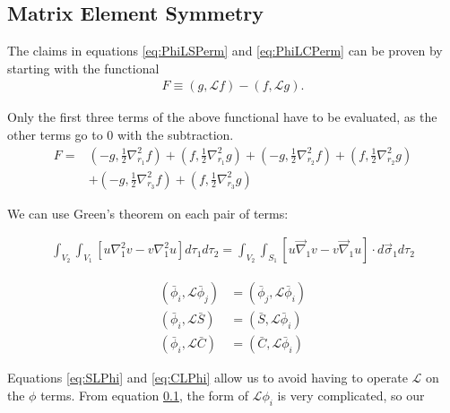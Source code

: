 \documentclass[Dissertation.tex]{subfiles}
\begin{document}
\subsection{Matrix Element Symmetry}
The claims in equations \ref{eq:PhiLSPerm} and \ref{eq:PhiLCPerm} can be proven by starting with the functional
\begin{align}
	F \equiv \left(g,\mathcal{L}f \right)-\left(f,\mathcal{L}g \right).
\end{align}

Only the first three terms of the above functional have to be evaluated, as the other terms go to 0 with the subtraction.
\begin{align}
	F=&\left({-g,\frac{1}{2} \nabla_{r_1}^2 f}\right)+\left({f,\frac{1}{2} \nabla_{r_1}^2 g}\right)+
	\left({-g,\frac{1}{2} \nabla_{r_2}^2 f}\right)+\left({f,\frac{1}{2} \nabla_{r_2}^2 g}\right) \nonumber \\
	&+\left({-g,\frac{1}{2} \nabla_{r_3}^2 f}\right)+\left({f,\frac{1}{2} \nabla_{r_3}^2 g}\right)
\end{align}

We can use Green's theorem on each pair of terms:


\begin{align}
	{\int _{V_2}{{\int_{V_1}{\left[{u{\nabla }_1^2 v-v{\nabla }_1^2 u}\right]{d \tau_1}}}{d \tau_2}}}
	= \int_{V_2} \int_{S_1} \left[u \vec{\nabla}_1 v - v \vec{\nabla}_1 u \right] \cdot d\vec{\sigma}_1 d\tau_2
\end{align}

\begin{subequations}
\label{eq:elem_symm}
\begin{align}
\left(\bar{\phi}_i, \mathcal{L} \bar{\phi}_j \right) &= \left(\bar{\phi}_j, \mathcal{L} \bar{\phi}_i \right) \\
\left(\bar{\phi}_i, \mathcal{L} \bar{S} \right) &= \left(\bar{S}, \mathcal{L} \bar{\phi}_i \right) \label{eq:SLPhi} \\
\left(\bar{\phi}_i, \mathcal{L} \bar{C} \right) &= \left(\bar{C}, \mathcal{L} \bar{\phi}_i \right) \label{eq:CLPhi}
\end{align}
\end{subequations}

\noindent Equations \ref{eq:SLPhi} and \ref{eq:CLPhi} allow us to avoid having to operate $\mathcal{L}$ on the $\phi$ terms. From equation \ref{}, the form of $\mathcal{L}\phi_i$ is very complicated, so our 
\end{document}
